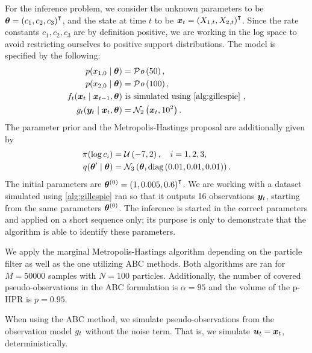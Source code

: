 For the inference problem, we consider the unknown parameters to be $\bm{\theta} = \left(c_1, c_2, c_3\right)^\intercal$, and the state at time $t$ to be $\bm{x}_t = \left(X_{1,t}, X_{2,t}\right)^\intercal$. Since the rate constants $c_1, c_2, c_3$ are by definition positive, we are working in the log space to avoid restricting ourselves to positive support distributions. The model is specified by the following:
\begin{equation*}
\begin{split}
\sprior(x_{1,0} \mid \btheta) &= \mathcal{P}\mathit{o}\left(50\right), \\
\sprior(x_{2,0} \mid \btheta) &= \mathcal{P}\mathit{o}\left(100\right), \\
\trans_t(\bx_t \mid \bx_{t-1}, \btheta) & \text{ is simulated using \autoref{alg:gillespie} }, \\
\obs_t(\by_t \mid \bx_{t}, \btheta) &= \mathcal{N}_2\left(\bx_t, 10^2\right).
\end{split}
\end{equation*}
The parameter prior and the Metropolis-Hastings proposal are additionally given by
\begin{equation*}
\begin{split}
\pi(\log c_i) &= \mathcal{U}\left(-7, 2\right), \quad i = 1, 2, 3, \\
q(\bm{\theta}^\prime \mid \bm{\theta}) &= \mathcal{N}_3\left(\bm{\theta}, \text{diag}\left(0.01, 0.01, 0.01\right)\right).
\end{split}
\end{equation*}
The initial parameters are $\bm{\theta}^{(0)} = \left(1, 0.005, 0.6\right)^\intercal$. We are working with a dataset simulated using \autoref{alg:gillespie} ran so that it outputs 16 observations $\bm{y}_t$, starting from the same parameters $\bm{\theta}^{(0)}$. The inference is started in the correct parameters and applied on a short sequence only; its purpose is only to demonstrate that the algorithm is able to identify these parameters.

We apply the marginal Metropolis-Hastings algorithm depending on the particle filter as well as the one utilizing ABC methods. Both algorithms are ran for $M = 50000$ samples with $N = 100$ particles. Additionally, the number of covered pseudo-observations in the ABC formulation is $\alpha = 95$ and the volume of the p-HPR is $p = 0.95$.

When using the ABC method, we simulate pseudo-observations from the observation model $g_t$ without the noise term. That is, we simulate $\bm{u}_t = \bm{x}_t$, deterministically.

